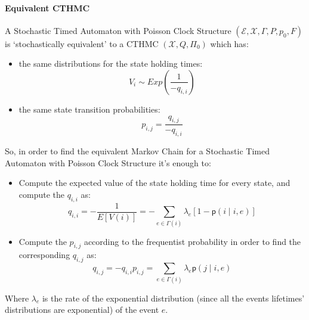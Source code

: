 \documentclass[12pt,a4paper]{article}
\newcommand*{\transp}{\mathsf{p}}
\begin{document}
\paragraph{Equivalent CTHMC} A Stochastic Timed Automaton with Poisson Clock Structure $(\mathcal{E},\mathcal{X},\Gamma,P,p_0,F)$
is `stochastically equivalent' to a CTHMC $(\mathcal{X},Q,\Pi_0)$ which has:
\begin{itemize}
\item the same distributions for the state holding times:
$$
V_i \sim Exp\left(\frac{1}{-q_{i,i}}\right)
$$
\item the same state transition probabilities:
$$
p_{i,j}=\frac{q_{i,j}}{-q_{i,i}}
$$
\end{itemize}  
So, in order to find the equivalent Markov Chain for a Stochastic Timed Automaton with Poisson Clock Structure it's enough to:
\begin{itemize}
\item Compute the expected value of the state holding time for every state, and compute the $q_{i,i}$ as:
$$
q_{i,i}=-\frac{1}{E[V(i)]}=-\sum_{e\in\Gamma(i)}{\lambda_e\left[1-\transp(i \mid i,e)\right]}
$$
\item Compute the $p_{i,j}$ according to the frequentist probability in order to find the corresponding $q_{i,j}$ as:
$$
q_{i,j}=-q_{i,i}p_{i,j}=\sum_{e\in\Gamma(i)}{\lambda_e \transp(j \mid i,e)}
$$
\end{itemize}
Where $\lambda_e$ is the rate of the exponential distribution (since all the events lifetimes' distributions are exponential) of the event $e$.
\newpage
\end{document}

